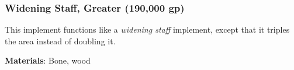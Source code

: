 \lowercase{\hypertarget{item:Widening Staff, Greater}{}}\label{item:Widening Staff, Greater}
\hypertarget{item:Widening Staff, Greater}{\subsubsection{Widening Staff, Greater\hfill{} (190,000 gp)}}

This implement functions like a \textit{widening staff} implement, except that it triples the area instead of doubling it.



\vspace{0.25em}
\textbf{Materials}: Bone, wood
